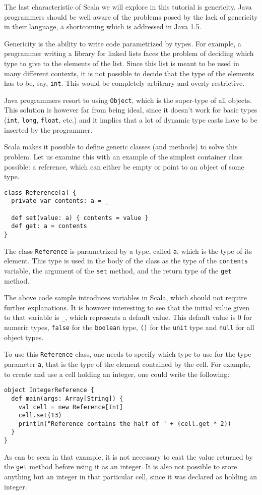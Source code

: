 \documentclass[a4paper,11pt,twoside,titlepage]{article}
\begin{document}
The last characteristic of Scala we will explore in this tutorial is
genericity. Java programmers should be well aware of the problems
posed by the lack of genericity in their language, a shortcoming which
is addressed in Java 1.5.

Genericity is the ability to write code parametrized by types. For
example, a programmer writing a library for linked lists faces the
problem of deciding which type to give to the elements of the list.
Since this list is meant to be used in many different contexts, it is
not possible to decide that the type of the elements has to be, say,
\lstinline?int?. This would be completely arbitrary and overly
restrictive.

Java programmers resort to using \lstinline?Object?, which is the
super-type of all objects. This solution is however far from being
ideal, since it doesn't work for basic types (\lstinline?int?,
\lstinline?long?, \lstinline?float?, etc.) and it implies that a lot of
dynamic type casts have to be inserted by the programmer.

Scala makes it possible to define generic classes (and methods) to
solve this problem. Let us examine this with an example of the
simplest container class possible: a reference, which can either be
empty or point to an object of some type.
\begin{lstlisting}
class Reference[a] {
  private var contents: a = _

  def set(value: a) { contents = value }
  def get: a = contents
}
\end{lstlisting}
The class \lstinline?Reference? is parametrized by a type, called \lstinline?a?,
which is the type of its element. This type is used in the body of the
class as the type of the \lstinline?contents? variable, the argument of
the \lstinline?set? method, and the return type of the \lstinline?get? method.

The above code sample introduces variables in Scala, which should not
require further explanations. It is however interesting to see that
the initial value given to that variable is \lstinline?_?, which represents
a default value. This default value is 0 for numeric types,
\lstinline?false? for the \lstinline?boolean? type, \lstinline?()? for the \lstinline?unit?
type and \lstinline?null? for all object types.

To use this \lstinline?Reference? class, one needs to specify which type to use
for the type parameter \lstinline?a?, that is the type of the element
contained by the cell. For example, to create and use a cell holding
an integer, one could write the following:
\begin{lstlisting}
object IntegerReference {
  def main(args: Array[String]) {
    val cell = new Reference[Int]
    cell.set(13)
    println("Reference contains the half of " + (cell.get * 2))
  }
}
\end{lstlisting}
As can be seen in that example, it is not necessary to cast the value
returned by the \lstinline?get? method before using it as an integer. It
is also not possible to store anything but an integer in that
particular cell, since it was declared as holding an integer.
\end{document}
